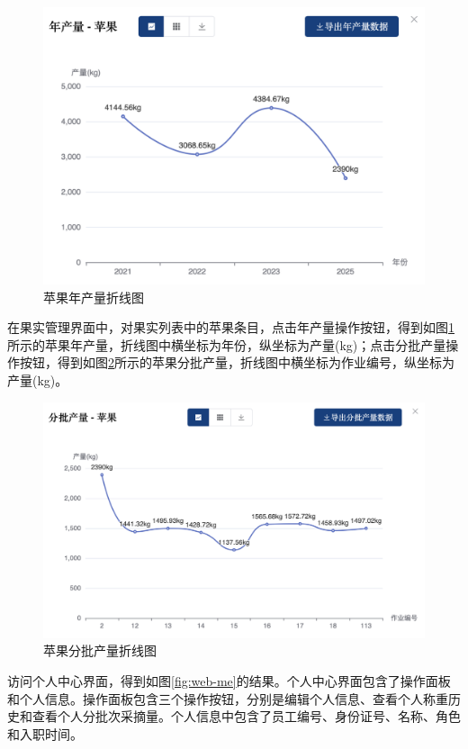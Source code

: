\begin{figure}[H]
    \centering
    \includegraphics[width=0.9\linewidth]{../result/chart-apple-year.png}
    \caption{苹果年产量折线图}
    \label{fig:chart-apple-year}
\end{figure}

在果实管理界面中，对果实列表中的苹果条目，点击年产量操作按钮，得到如图\ref{fig:chart-apple-year}所示的苹果年产量，折线图中横坐标为年份，纵坐标为产量(kg)；点击分批产量操作按钮，得到如图\ref{fig:chart-apple-works}所示的苹果分批产量，折线图中横坐标为作业编号，纵坐标为产量(kg)。

\begin{figure}[H]
    \centering
    \includegraphics[width=0.9\linewidth]{../result/chart-apple-works.png}
    \caption{苹果分批产量折线图}
    \label{fig:chart-apple-works}
\end{figure}

访问个人中心界面，得到如图\ref{fig:web-me}的结果。个人中心界面包含了操作面板和个人信息。操作面板包含三个操作按钮，分别是编辑个人信息、查看个人称重历史和查看个人分批次采摘量。个人信息中包含了员工编号、身份证号、名称、角色和入职时间。

